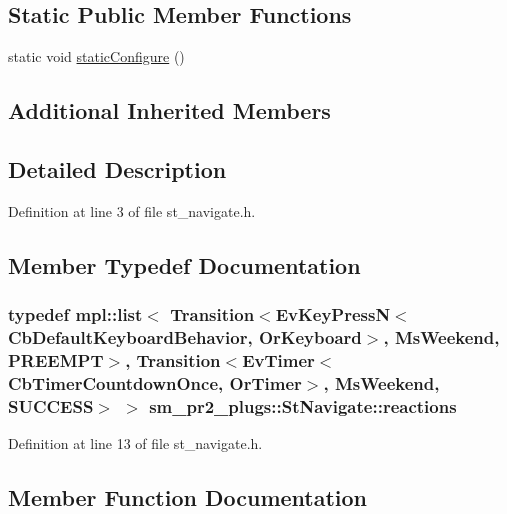 \subsection*{Static Public Member Functions}
\begin{DoxyCompactItemize}
\item 
static void \hyperlink{structsm__pr2__plugs_1_1StNavigate_a052e5c763e3e8d487f3dcaa2a9a2fab0}{static\+Configure} ()
\end{DoxyCompactItemize}
\subsection*{Additional Inherited Members}


\subsection{Detailed Description}


Definition at line 3 of file st\+\_\+navigate.\+h.



\subsection{Member Typedef Documentation}
\subsubsection[{\texorpdfstring{reactions}{reactions}}]{\setlength{\rightskip}{0pt plus 5cm}typedef mpl\+::list$<$ Transition$<$Ev\+Key\+PressN$<$Cb\+Default\+Keyboard\+Behavior, {\bf Or\+Keyboard}$>$, {\bf Ms\+Weekend}, {\bf P\+R\+E\+E\+M\+PT}$>$, Transition$<$Ev\+Timer$<$Cb\+Timer\+Countdown\+Once, {\bf Or\+Timer}$>$, {\bf Ms\+Weekend}, {\bf S\+U\+C\+C\+E\+SS}$>$ $>$ {\bf sm\+\_\+pr2\+\_\+plugs\+::\+St\+Navigate\+::reactions}}\hypertarget{structsm__pr2__plugs_1_1StNavigate_add87afacee80fd59c74b8d4d74dc25ad}{}\label{structsm__pr2__plugs_1_1StNavigate_add87afacee80fd59c74b8d4d74dc25ad}


Definition at line 13 of file st\+\_\+navigate.\+h.



\subsection{Member Function Documentation}
